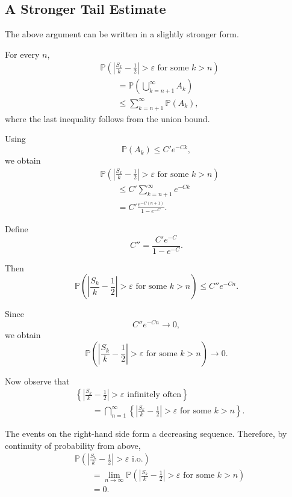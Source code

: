 \subsection{A Stronger Tail Estimate}

The above argument can be written in a slightly stronger form.

For every $n$,
\[
\begin{aligned}
&\mathbb{P}
\left(
\left|
\frac{S_k}{k}-\frac12
\right|>\varepsilon
\text{ for some }k>n
\right)
\\
&\qquad=
\mathbb{P}
\left(
\bigcup_{k=n+1}^{\infty}A_k
\right)\\
&\qquad\leq
\sum_{k=n+1}^{\infty}
\mathbb{P}(A_k),
\end{aligned}
\]
where the last inequality follows from the union bound.

Using
\[
\mathbb{P}(A_k)\leq C'e^{-Ck},
\]
we obtain
\[
\begin{aligned}
&\mathbb{P}
\left(
\left|
\frac{S_k}{k}-\frac12
\right|>\varepsilon
\text{ for some }k>n
\right)
\\
&\qquad\leq
C'\sum_{k=n+1}^{\infty}e^{-Ck}\\
&\qquad=
C'
\frac{e^{-C(n+1)}}{1-e^{-C}}.
\end{aligned}
\]

Define
\[
C''
=
\frac{C'e^{-C}}{1-e^{-C}}.
\]

Then
\[
\boxed{
\mathbb{P}
\left(
\left|
\frac{S_k}{k}-\frac12
\right|>\varepsilon
\text{ for some }k>n
\right)
\leq
C''e^{-Cn}.
}
\]

Since
\[
C''e^{-Cn}\longrightarrow0,
\]
we obtain
\[
\boxed{
\mathbb{P}
\left(
\left|
\frac{S_k}{k}-\frac12
\right|>\varepsilon
\text{ for some }k>n
\right)
\longrightarrow0.
}
\]

Now observe that
\[
\begin{aligned}
&
\left\{
\left|
\frac{S_k}{k}-\frac12
\right|>\varepsilon
\text{ infinitely often}
\right\}
\\
&\qquad=
\bigcap_{n=1}^{\infty}
\left\{
\left|
\frac{S_k}{k}-\frac12
\right|>\varepsilon
\text{ for some }k>n
\right\}.
\end{aligned}
\]

The events on the right-hand side form a decreasing sequence.
Therefore, by continuity of probability from above,
\[
\begin{aligned}
&
\mathbb{P}
\left(
\left|
\frac{S_k}{k}-\frac12
\right|>\varepsilon
\text{ i.o.}
\right)
\\
&\qquad=
\lim_{n\to\infty}
\mathbb{P}
\left(
\left|
\frac{S_k}{k}-\frac12
\right|>\varepsilon
\text{ for some }k>n
\right)\\
&\qquad=0.
\end{aligned}
\]

